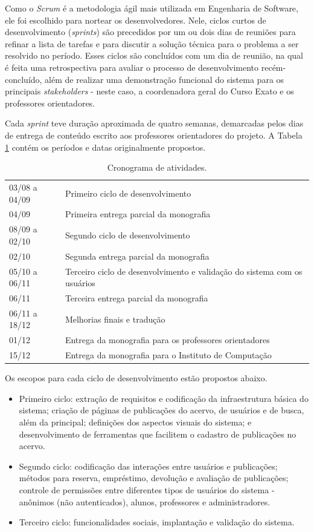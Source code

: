 \documentclass[a4paper]{article}
\begin{document}
Como o \textit{Scrum} \cite{scrum} é a metodologia ágil mais utilizada em Engenharia de Software, ele foi escolhido para nortear os desenvolvedores. Nele, ciclos curtos de desenvolvimento (\textit{sprints}) são precedidos por um ou dois dias de reuniões para refinar a lista de tarefas e para discutir a solução técnica para o problema a ser resolvido no período. Esses ciclos são concluídos com um dia de reunião, na qual é feita uma retrospectiva para avaliar o processo de desenvolvimento recém-concluído, além de realizar uma demonstração funcional do sistema para os principais \textit{stakeholders} - neste caso, a coordenadora geral do Curso Exato e os professores orientadores.

Cada \textit{sprint} teve duração aproximada de quatro semanas, demarcadas pelos dias de entrega de conteúdo escrito aos professores orientadores do projeto. A Tabela \ref{cronograma} contém os períodos e datas originalmente propostos.

\begin{table}[hc]
\centering
\caption{Cronograma de atividades.\label{cronograma}}
\begin{tabular}{ll}
\hline
03/08 a 04/09 & Primeiro ciclo de desenvolvimento \\
04/09 & Primeira entrega parcial da monografia \\
08/09 a 02/10 & Segundo ciclo de desenvolvimento \\
02/10 & Segunda entrega parcial da monografia \\
05/10 a 06/11 & Terceiro ciclo de desenvolvimento e validação do sistema com os usuários \\
06/11 & Terceira entrega parcial da monografia \\
06/11 a 18/12 & Melhorias finais e tradução\\
01/12 & Entrega da monografia para os professores orientadores\\
15/12 & Entrega da monografia para o Instituto de Computação\\
\hline
\end{tabular}
\end{table}

Os escopos para cada ciclo de desenvolvimento estão propostos abaixo.

\begin{itemize}
\item Primeiro ciclo: extração de requisitos e codificação da infraestrutura básica do sistema; criação de páginas de publicações do acervo, de usuários e de busca, além da principal; definições dos aspectos visuais do sistema; e desenvolvimento de ferramentas que facilitem o cadastro de publicações no acervo.
\item Segundo ciclo: codificação das interações entre usuários e publicações; métodos para reserva, empréstimo, devolução e avaliação de publicações; controle de permissões entre diferentes tipos de usuários do sistema - anônimos (não autenticados), alunos, professores e administradores.
\item Terceiro ciclo: funcionalidades sociais, implantação e validação do sistema.
\end{itemize}
\end{document}
